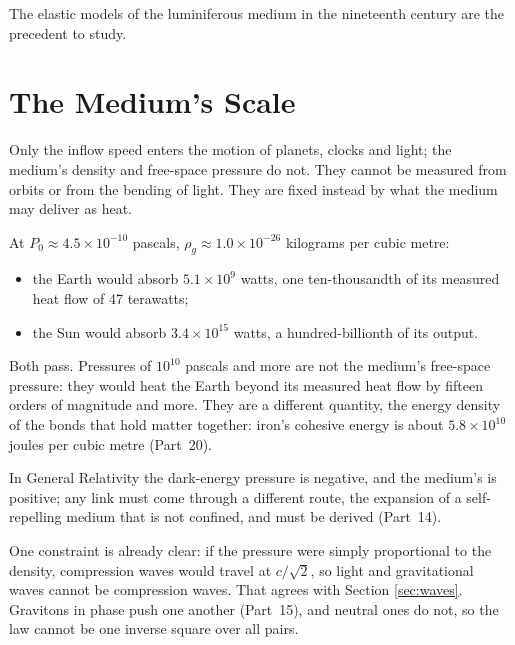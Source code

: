 \documentclass[11pt,a4paper]{article}
\begin{document}
 The elastic models of the luminiferous medium in the nineteenth century are the precedent to study.

\section{The Medium's Scale}
\label{sec:scale}

Only the inflow speed enters the motion of planets, clocks and light; the medium's density and free-space pressure do not. They cannot be measured from orbits or from the bending of light. They are fixed instead by what the medium may deliver as heat.

 At $P_0 \approx 4.5\times10^{-10}$ pascals, $\rho_g \approx 1.0\times10^{-26}$ kilograms per cubic metre:
\begin{itemize}
\item the Earth would absorb $5.1\times10^{9}$ watts, one ten-thousandth of its measured heat flow of 47 terawatts;
\item the Sun would absorb $3.4\times10^{15}$ watts, a hundred-billionth of its output.
\end{itemize}
Both pass. Pressures of $10^{10}$ pascals and more are not the medium's free-space pressure: they would heat the Earth beyond its measured heat flow by fifteen orders of magnitude and more. They are a different quantity, the energy density of the bonds that hold matter together: iron's cohesive energy is about $5.8\times10^{10}$ joules per cubic metre (Part~20).

 In General Relativity the dark-energy pressure is negative, and the medium's is positive; any link must come through a different route, the expansion of a self-repelling medium that is not confined, and must be derived (Part~14).

 One constraint is already clear: if the pressure were simply proportional to the density, compression waves would travel at $c/\sqrt2$, so light and gravitational waves cannot be compression waves. That agrees with Section \ref{sec:waves}. Gravitons in phase push one another (Part~15), and neutral ones do not, so the law cannot be one inverse square over all pairs.
\end{document}
